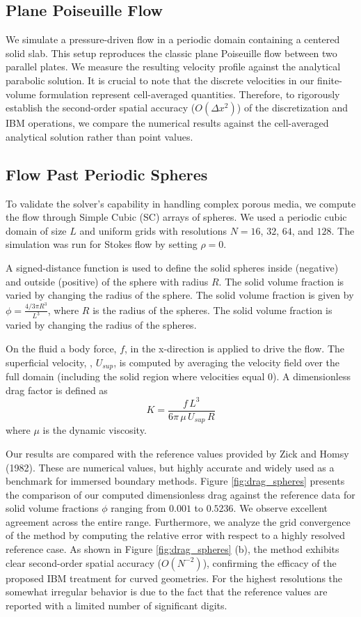 \documentclass[preprint,12pt]{elsarticle}
\begin{document}
\subsection{Plane Poiseuille Flow}
We simulate a pressure-driven flow in a periodic domain containing a centered solid slab. This setup reproduces the classic plane Poiseuille flow between two parallel plates. We measure the resulting velocity profile against the analytical parabolic solution. It is crucial to note that the discrete velocities in our finite-volume formulation represent cell-averaged quantities. Therefore, to rigorously establish the second-order spatial accuracy ($O(\Delta x^2)$) of the discretization and IBM operations, we compare the numerical results against the cell-averaged analytical solution rather than point values.

\subsection{Flow Past Periodic Spheres}

To validate the solver's capability in handling complex porous media, we compute the flow through Simple Cubic (SC) arrays of spheres.  We used a periodic cubic domain of size $L$ and uniform grids with resolutions $N=16$, $32$, $64$, and $128$. The simulation was run for Stokes flow by setting $\rho=0$.

A signed-distance function is used to define the solid spheres inside (negative) and outside (positive) of the sphere with radius $R$. The solid volume fraction is varied by changing the radius of the sphere.
The solid volume fraction is given by $\phi = \frac{4/3 \pi R^3}{L^3}$, where $R$ is the radius of the spheres. The solid volume fraction is varied by changing the radius of the spheres.

On the fluid a body force, $f$, in the x-direction is applied to drive the flow. The superficial velocity, , $U_{sup}$, is computed by averaging the velocity field over the full domain (including the solid region where velocities equal 0). A dimensionless drag factor is defined as
\begin{equation}
    K = \frac{f \, L^3}{6 \pi \, \mu \, U_{sup} \, R}
\end{equation}
where $\mu$ is the dynamic viscosity.

Our results are compared with the reference values provided by Zick and Homsy (1982). These are numerical values, but highly accurate and widely used as a benchmark for immersed boundary methods.
Figure \ref{fig:drag_spheres} presents the comparison of our computed dimensionless drag against the reference data for solid volume fractions $\phi$ ranging from $0.001$ to $0.5236$. We observe excellent agreement across the entire range. Furthermore, we analyze the grid convergence of the method by computing the relative error with respect to a highly resolved reference case. As shown in Figure \ref{fig:drag_spheres} (b), the method exhibits clear second-order spatial accuracy ($O(N^{-2})$), confirming the efficacy of the proposed IBM treatment for curved geometries. For the highest resolutions the somewhat irregular behavior is due to the fact that the reference values are reported with a limited number of significant digits.
\end{document}
